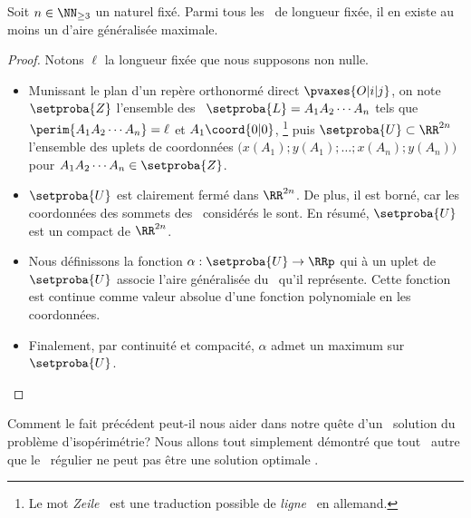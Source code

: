 \begin{fact} \label{suff-cond}
    Soit $n \in \NN_{\geq3}$ un naturel fixé.
    Parmi tous les \ncycles\ de longueur fixée, il en existe au moins un d'aire généralisée maximale.
\end{fact}


\begin{proof}
	Notons $\ell$ la longueur fixée que nous supposons non nulle.
    \begin{itemize}
        \item Munissant le plan d'un repère orthonormé direct $\pvaxes{O | i | j}$, on note $\setproba{Z}$ l'ensemble des \ncycles\ $\setproba{L} = A_1 A_2 \cdots A_n$ tels que
        $\perim{A_1 A_2 \cdots A_n} = \ell$
        et
        $A_1\coord{0 | 0}$,%
        \footnote{
        	Le mot \og \emph{Zeile} \fg\ est une traduction possible de \og \emph{ligne} \fg\ en allemand.
        }
        puis $\setproba{U} \subset \RR^{2n}$ l'ensemble des uplets de coordonnées $\big( x(A_1) ; y(A_1) ; \dots ; x(A_n) ; y(A_n) \big)$ pour $A_1 A_2 \cdots A_n \in \setproba{Z}$.


        \item $\setproba{U}$ est clairement fermé dans $\RR^{2n}$.
        De plus, il est borné, car les coordonnées des sommets des \ncycles\ considérés le sont.
        En résumé, $\setproba{U}$ est un compact de $\RR^{2n}$.


        \item Nous définissons la fonction $\alpha: \setproba{U} \rightarrow \RRp$ qui à un uplet de $\setproba{U}$ associe l'aire généralisée du \ncycle\ qu'il représente.
        Cette fonction est continue comme valeur absolue d'une fonction polynomiale en les coordonnées.


        \item Finalement, par continuité et compacité, $\alpha$ admet un maximum sur $\setproba{U}$.
    \end{itemize}
\end{proof}




Comment le fait précédent peut-il nous aider dans notre quête d'un \ngone\ solution du problème d'isopérimétrie? Nous allons tout simplement démontré que tout \ncycle\ autre que le \ngone\ régulier ne peut pas être une solution \og optimale \fg.
